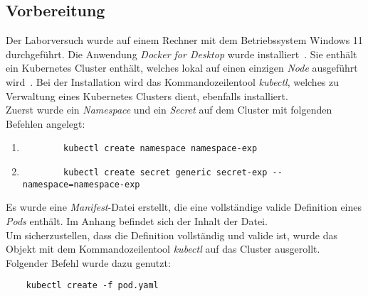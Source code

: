 \subsection{Vorbereitung}\label{subsec:preparation}
Der Laborversuch wurde auf einem Rechner mit dem Betriebssystem Windows 11 durchgeführt.
Die Anwendung \textit{Docker for Desktop} wurde installiert~\cite{docker-for-desktop-overview}. Sie enthält ein Kubernetes Cluster enthält,
welches lokal auf einen einzigen \textit{Node} ausgeführt wird~\cite{docker-for-desktop-kubernetes}.
Bei der Installation wird das Kommandozeilentool \textit{kubectl}, welches zu Verwaltung eines Kubernetes Clusters dient, ebenfalls installiert.
\\
Zuerst wurde ein \textit{Namespace} und ein \textit{Secret} auf dem Cluster mit folgenden Befehlen angelegt:
\begin{enumerate}
    \item
          \begin{verbatim}
        kubectl create namespace namespace-exp
    \end{verbatim}
    \item
          \begin{verbatim}
        kubectl create secret generic secret-exp --namespace=namespace-exp
    \end{verbatim}
\end{enumerate}
Es wurde eine \textit{Manifest}-Datei erstellt, die eine vollständige valide Definition eines \textit{Pods} enthält.
Im Anhang befindet sich der Inhalt der Datei.
\\
Um sicherzustellen, dass die Definition vollständig und valide ist, wurde das Objekt mit dem Kommandozeilentool \textit{kubectl} auf das Cluster ausgerollt.
Folgender Befehl wurde dazu genutzt:

\begin{verbatim}
    kubectl create -f pod.yaml
\end{verbatim}

